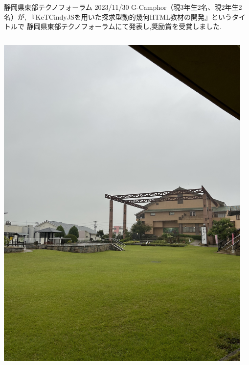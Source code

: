\documentclass[dvipdfmx, unicode]{beamer}
\begin{document}
\begin{frame}[t]{静岡県東部テクノフォーラム 2023/11/30}
  G-Camphor（現3年生2名、現2年生2名）が,
  『KeTCindyJSを用いた探求型動的幾何HTML教材の開発』というタイトルで
  静岡県東部テクノフォーラムにて発表し,奨励賞を受賞しました.
  \begin{columns}[T]
    \begin{column}{0.5\linewidth}
      \centering
      \includegraphics[scale=0.04]{img/ActiveReport/20231015.png}
    \end{column}
    \begin{column}{0.5\linewidth}
      \centering

\end{column}
\end{columns}
\end{frame}
\end{document}
